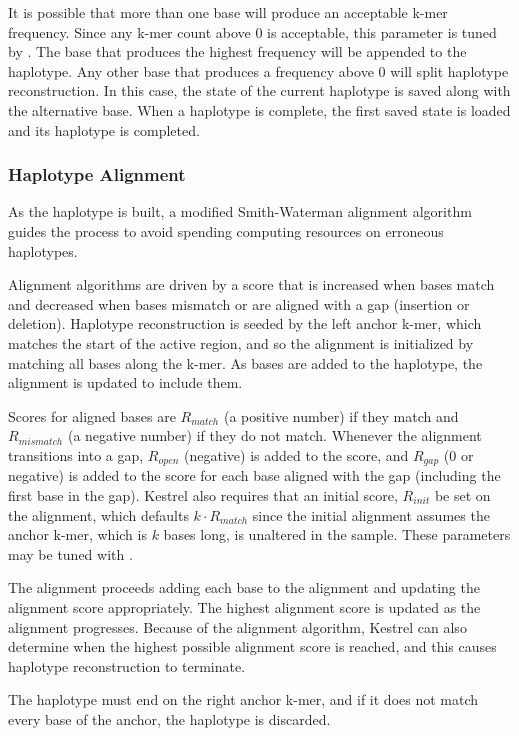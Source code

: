 It is possible that more than one base will produce an acceptable k-mer frequency. Since any k-mer count above $0$ is acceptable, this parameter is tuned by . The base that produces the highest frequency will be appended to the haplotype. Any other base that produces a frequency above $0$ will split haplotype reconstruction. In this case, the state of the current haplotype is saved along with the alternative base. When a haplotype is complete, the first saved state is loaded and its haplotype is completed.

\subsubsection{Haplotype Alignment}
\label{sec.process.haplo.align}

As the haplotype is built, a modified Smith-Waterman alignment algorithm guides the process to avoid spending computing resources on erroneous haplotypes.

Alignment algorithms are driven by a score that is increased when bases match and decreased when bases mismatch or are aligned with a gap (insertion or deletion). Haplotype reconstruction is seeded by the left anchor k-mer, which matches the start of the active region, and so the alignment is initialized by matching all bases along the k-mer. As bases are added to the haplotype, the alignment is updated to include them.

Scores for aligned bases are $R_{match}$ (a positive number) if they match and $R_{mismatch}$ (a negative number) if they do not match. Whenever the alignment transitions into a gap, $R_{open}$ (negative) is added to the score, and $R_{gap}$ ($0$ or negative) is added to the score for each base aligned with the gap (including the first base in the gap). Kestrel also requires that an initial score, $R_{init}$ be set on the alignment, which defaults $k \cdot R_{match}$ since the initial alignment assumes the anchor k-mer, which is $k$ bases long, is unaltered in the sample. These parameters may be tuned with .

The alignment proceeds adding each base to the alignment and updating the alignment score appropriately. The highest alignment score is updated as the alignment progresses. Because of the alignment algorithm, Kestrel can also determine when the highest possible alignment score is reached, and this causes haplotype reconstruction to terminate.

The haplotype must end on the right anchor k-mer, and if it does not match every base of the anchor, the haplotype is discarded.

